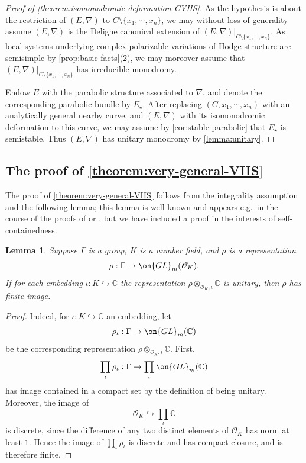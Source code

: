 \documentclass[12 pt]{amsart}
\theoremstyle{plain}
\newtheorem{lemma}[subsubsection]{Lemma}
\theoremstyle{definition}
\theoremstyle{remark}
\numberwithin{equation}{section}
\begin{document}
\begin{proof}[Proof of \autoref{theorem:isomonodromic-deformation-CVHS}]
As the hypothesis is about the restriction of $(E, \nabla)$ to $C\setminus \{x_1, \cdots, x_n\}$, we may without loss of generality assume $(E,\nabla)$ is the Deligne canonical extension of $(E, \nabla)|_{C\setminus \{x_1, \cdots, x_n\}}$. As local systems underlying complex polarizable variations of Hodge structure are semisimple by \autoref{prop:basic-facts}(2), we may moreover assume that $(E, \nabla)|_{C\setminus \{x_1, \cdots, x_n\}}$ has irreducible monodromy.

Endow $E$ with the parabolic structure associated to $\nabla$, and denote the
corresponding parabolic bundle by $E_\star$.
After replacing $(C, x_1, \cdots, x_n)$ with an analytically general nearby
curve, and $(E,\nabla)$ with its isomonodromic deformation to this curve, we may
assume by \autoref{cor:stable-parabolic} that $E_\star$ is semistable.	Thus $(E, \nabla)$ has unitary monodromy by \autoref{lemma:unitary}.
\end{proof}

\subsection{The proof of \autoref{theorem:very-general-VHS}} 
\label{subsection:very-general-vhs}
The proof of \autoref{theorem:very-general-VHS} follows  
from the integrality assumption and the following lemma; this lemma is well-known and appears e.g.~in the course of the proofs of \cite[Proposition 4.2.1.3]{katz:pcurvature-and-hodge} or \cite[Proposition 8.2]{esnault2020rigid}, but we have included a proof in the interests of self-containedness.

\begin{lemma}
	\label{lemma:integral-and-unitary-implies-finite}
	Suppose $\Gamma$ is a group,
	$K$ is a number field, and $\rho$ is
	a representation $$\rho: \Gamma\to \on{GL}_m(\mathscr{O}_K).$$
	If for each embedding $\iota: K\hookrightarrow \mathbb{C}$ the 
	representation $\rho\otimes_{\mathscr{O}_K, \iota} \mathbb{C}$ is unitary, then
	$\rho$ has finite image.
\end{lemma}
\begin{proof}
Indeed, for $\iota: K\hookrightarrow\mathbb{C}$ an embedding, let $$\rho_\iota:
\Gamma\to \on{GL}_m(\mathbb{C})$$ be the corresponding representation $\rho\otimes_{\mathscr{O}_K, \iota} \mathbb{C}$. First,
$$\prod_\iota \rho_\iota: \Gamma\to \prod_\iota \on{GL}_m(\mathbb{C})$$ has
image contained in a compact set by the definition of being unitary. 
Moreover, the image of $$\mathscr{O}_K\hookrightarrow \prod_\iota \mathbb{C}$$
is discrete, since the difference of any two distinct elements of
$\mathscr{O}_K$ has norm at least $1$.
Hence the image of $\prod_\iota \rho_\iota$ is discrete and has compact closure, and is therefore finite.
\end{proof}
\end{document}
